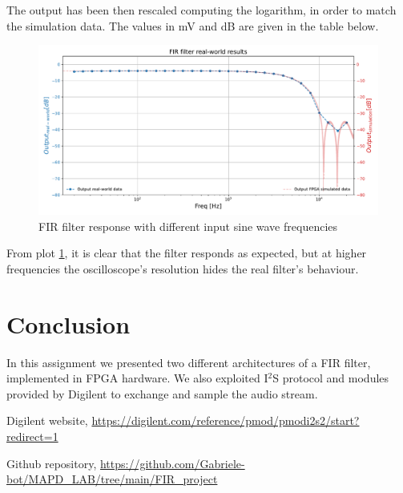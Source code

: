 \documentclass[11pt, a4paper]{article}
\begin{document}
The output has been then rescaled computing the logarithm, in order to match the simulation data. The values in mV and dB are given in the table below.

\begin{figure}[!h]
    \centering
    \includegraphics[width=1.0\textwidth]{images/real_wolrd_plot_log.pdf}
    \caption{FIR filter response with different input sine wave frequencies}
    \label{fig:FIR_real-wolrd}
\end{figure}

From plot \ref{fig:FIR_real-wolrd}, it is clear that the filter responds as expected, but at higher frequencies the oscilloscope's resolution hides the real filter's behaviour.



\section{Conclusion}
In this assignment we presented two different architectures of a FIR filter, implemented in FPGA hardware. We also exploited I$^2$S protocol and modules provided by Digilent to exchange and sample the audio stream.

\begin{thebibliography}{99}
    
        Digilent website, 
        \url{https://digilent.com/reference/pmod/pmodi2s2/start?redirect=1}
        
        Github repository, 
        \url{https://github.com/Gabriele-bot/MAPD_LAB/tree/main/FIR_project}
        
    \end{thebibliography}
\end{document}

